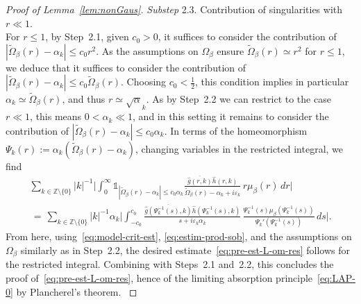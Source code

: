 \documentclass[a4paper,11pt,reqno,noindent]{amsart}
\theoremstyle{plain}
\numberwithin{equation}{section}
\newcommand{\e}{\varepsilon}
\newcommand{\Z}{\mathbb Z}
\newcommand{\3}{|\!|\!|}
\newcommand{\substep}[1]{\noindent \textit{Substep} #1.}
\begin{document}
\begin{proof}[Proof of Lemma~\ref{lem:nonGaus}]
{\medskip
\substep{2.3} Contribution of singularities with $r\ll1$.\\
For $r\le1$, by Step~2.1, given $c_0>0$, it suffices to consider the contribution of $|\tilde\Omega_\beta(r)-\alpha_k|\le c_0r^2$. As the assumptions on $\Omega_\beta$ ensure $\tilde\Omega_\beta(r)\simeq r^2$ for $r\le1$, we deduce that it suffices to consider the contribution of $|\tilde\Omega_\beta(r)-\alpha_k|\le c_0\tilde\Omega_\beta(r)$.
Choosing $c_0<\frac12$, this condition implies in particular $\alpha_k\simeq\tilde\Omega_\beta(r)$, and thus $r\simeq\sqrt\alpha_k$.
As by Step~2.2 we can restrict to the case $r\ll1$, this means $0<\alpha_k\ll1$, and in this setting it remains to consider the contribution of $|\tilde\Omega_\beta(r)-\alpha_k|\le c_0\alpha_k$.
In terms of the homeomorphism $\Psi_k(r):=\alpha_k(\tilde\Omega_\beta(r)-\alpha_k)$, changing variables in the restricted integral, we find
\begin{multline*}
\sum_{k\in\Z\setminus\{0\}}|k|^{-1}\bigg|\int_{0}^{\infty}\mathds1_{|\tilde\Omega_\beta(r)-\alpha_k|\le c_0\alpha_k}\frac{\overline{\hat g(r,k)}\hat h(r,k)}{\tilde\Omega_\beta(r)-\alpha_k+i\e_k}\,r\mu_\beta(r)\,dr\bigg|\\
\,=\,\sum_{k\in\Z\setminus\{0\}}|k|^{-1}\alpha_k\bigg|\int_{-c_0}^{c_0}\frac{\overline{\hat g(\Psi_k^{-1}(s),k)}\hat h(\Psi_k^{-1}(s),k)}{s+i\e_k\alpha_k}\,\frac{\Psi_k^{-1}(s)\mu_\beta(\Psi_k^{-1}(s))}{\Psi_k'(\Psi_k^{-1}(s))}\,ds\bigg|.
\end{multline*}
From here, using~\eqref{eq:model-crit-est}, \eqref{eq:estim-prod-sob}, and the assumptions on $\Omega_\beta$ similarly as in Step~2.2, the desired estimate~\eqref{eq:pre-est-L-om-res} follows for the restricted integral. Combining with Steps~2.1 and~2.2, this concludes the proof of~\eqref{eq:pre-est-L-om-res}, hence of the limiting absorption principle~\eqref{eq:LAP-0} by Plancherel's theorem.
}


\end{proof}
\end{document}
